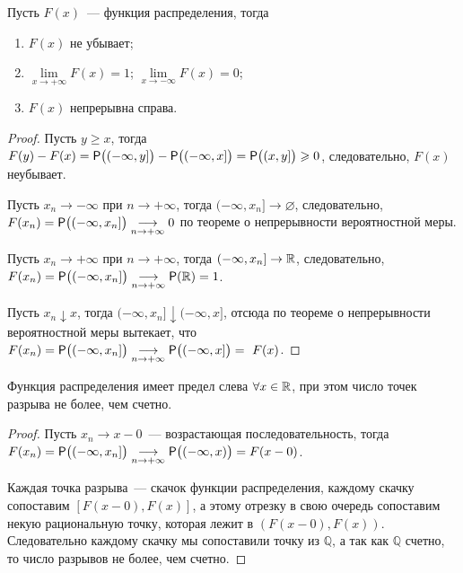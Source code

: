 \begin{lemma}
	Пусть $F(x)$~--- функция распределения, тогда
	\begin{enumerate}
		\item $F(x)$ не убывает;
		\item $\lim\limits_{x \rightarrow +\infty} F(x) = 1$; $\lim\limits_{x \rightarrow -\infty} F(x) = 0$;
		\item $F(x)$ непрерывна справа.
	\end{enumerate}
	\begin{proof}
		Пусть $y \geqslant x$, тогда $F(y) - F(x) = \P \big( (-\infty, y] \big) - \P \big( (-\infty, x] \big) = \P \big( (x, y] \big) \geqslant 0$, следовательно, $F(x)$ неубывает.
		
		Пусть $x_n \rightarrow -\infty$ при $n \rightarrow +\infty$, тогда $(-\infty, x_n] \rightarrow \varnothing$, следовательно, $F(x_n) = \P \big( (-\infty, x_n] \big) \underset{n \rightarrow +\infty}{\longrightarrow} 0$ по теореме о непрерывности вероятностной меры. 
		
		Пусть $x_n \rightarrow +\infty$ при $n \rightarrow +\infty$, тогда $(-\infty, x_n] \rightarrow \R$, следовательно, $F(x_n) = \P \big( (-\infty, x_n] \big) \underset{n \rightarrow +\infty}{\longrightarrow} \P(\R) = 1$.
				
		Пусть $x_n \downarrow x$, тогда $(-\infty, x_n] \downarrow (-\infty, x]$, отсюда по теореме о непрерывности вероятностной меры вытекает, что $F(x_n) = \P \big( (-\infty, x_n] \big) \underset{n \rightarrow +\infty}{\longrightarrow} \P \big( (-\infty, x] \big) =~F(x)$.
	\end{proof}
\end{lemma}
\begin{property}
	Функция распределения имеет предел слева $\forall x \in \R$, при этом число точек разрыва не более, чем счетно.
	\begin{proof}
		Пусть $x_n \rightarrow x - 0$~--- возрастающая последовательность, тогда $F(x_n) = \P \big( (-\infty, x_n] \big) \underset{n \rightarrow +\infty}{\longrightarrow} \P \big( (-\infty, x) \big) = F(x - 0)$. 
		
		Каждая точка разрыва~--- скачок функции распределения, каждому скачку сопоставим $[F(x-0), F(x)]$, а этому отрезку в свою очередь сопоставим некую рациональную точку, которая лежит в $(F(x-0), F(x))$. Следовательно каждому скачку мы сопоставили точку из $\mathbb{Q}$, а так как $\mathbb{Q}$ счетно, то число разрывов не более, чем счетно.
	\end{proof}
\end{property}
